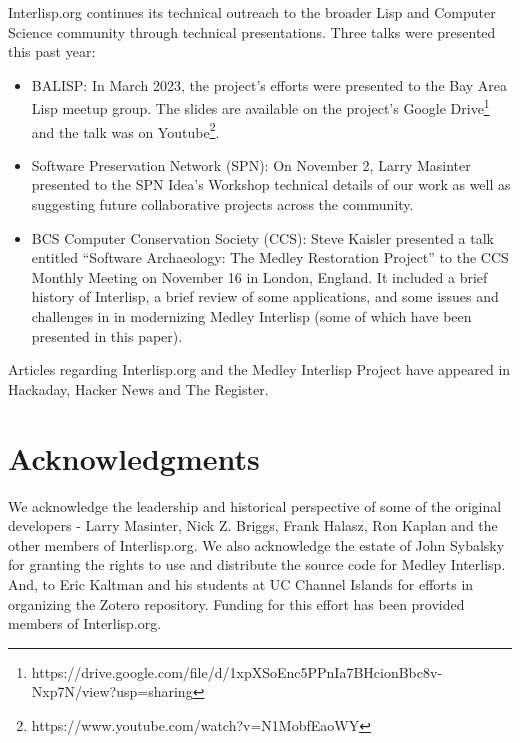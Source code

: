\documentclass[sigconf]{acmart}
\begin{document}
Interlisp.org continues its technical outreach to the broader Lisp and Computer Science community through technical presentations. Three talks were presented this past year:
\begin{itemize}
    \item BALISP: In March 2023, the project's efforts were presented to the Bay Area Lisp meetup group. The slides are available on the project's Google Drive\footnote{https://drive.google.com/file/d/1xpXSoEnc5PPnIa7BHcionBbc8v-Nxp7N/view?usp=sharing} and the talk was on Youtube\footnote{https://www.youtube.com/watch?v=N1MobfEaoWY}.
    \item Software Preservation Network (SPN): On November 2, Larry Masinter presented to the SPN Idea's Workshop technical details of our work as well as suggesting future collaborative projects across the community.
    \item BCS Computer Conservation Society (CCS): Steve Kaisler presented a talk entitled ``Software Archaeology: The Medley Restoration Project'' to the CCS Monthly Meeting on November 16 in London, England. It included a brief history of Interlisp, a brief review of some applications, and some issues and challenges in in modernizing Medley Interlisp (some of which have been presented in this paper).
\end{itemize}

Articles regarding Interlisp.org and the Medley Interlisp Project have appeared in Hackaday, Hacker News and The Register\cite{Proven23}.

\section*{Acknowledgments}

We acknowledge the leadership and historical perspective of some of the original developers - Larry Masinter, Nick Z. Briggs, Frank Halasz, Ron Kaplan and the other members of Interlisp.org. We also acknowledge the estate of John Sybalsky for granting the rights to use and distribute the source code for Medley Interlisp. And, to Eric Kaltman and his students at UC Channel Islands for efforts in organizing the Zotero repository. Funding for this effort has been provided members of Interlisp.org.



\end{document}

